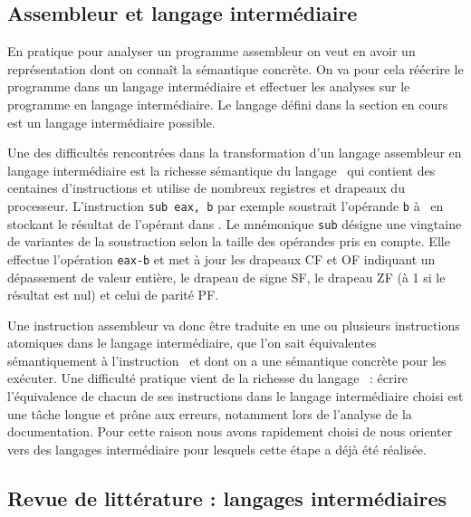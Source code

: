 \subsection{Assembleur et langage intermédiaire}
En pratique pour analyser un programme assembleur on veut en avoir un représentation dont on connaît la sémantique concrète.
On va pour cela réécrire le programme dans un langage intermédiaire et effectuer les analyses sur le programme en langage intermédiaire. Le langage défini dans la section en cours est un langage intermédiaire possible.

Une des difficultés rencontrées dans la transformation d'un langage assembleur en langage intermédiaire est la richesse sémantique du langage \xq\ qui contient des centaines d'instructions et utilise de nombreux registres et drapeaux du processeur.
L'instruction \texttt{sub eax, b} par exemple soustrait l'opérande \texttt{b} à \eax\  en stockant le résultat de l'opérant dans \eax.
Le mnémonique \texttt{sub} désigne une vingtaine de variantes de la soustraction selon la taille des opérandes pris en compte. Elle effectue l'opération \texttt{eax-b} et met à jour les drapeaux CF et OF indiquant un dépassement de valeur entière, le drapeau de signe SF, le drapeau ZF (à 1 si le résultat est nul) et celui de parité PF.

Une instruction assembleur va donc être traduite en une ou plusieurs instructions atomiques dans le langage intermédiaire, que l'on sait équivalentes sémantiquement à l'instruction \xq\ et dont on a une sémantique concrète pour les exécuter.
Une difficulté pratique vient de la richesse du langage \xq\ : écrire l'équivalence de chacun de ses instructions dans le langage intermédiaire choisi est une tâche longue et prône aux erreurs, notamment lors de l'analyse de la documentation. Pour cette raison nous avons rapidement choisi de nous orienter vers des langages intermédiaire pour lesquels cette étape a déjà été réalisée.

\subsection{Revue de littérature : langages intermédiaires}

